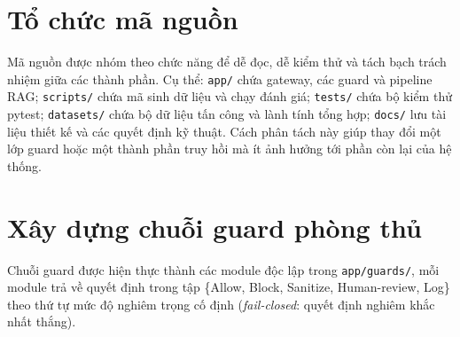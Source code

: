 \section{Tổ chức mã nguồn}

Mã nguồn được nhóm theo chức năng để dễ đọc, dễ kiểm thử và tách bạch trách
nhiệm giữa các thành phần. Cụ thể: \texttt{app/} chứa gateway, các guard và
pipeline RAG; \texttt{scripts/} chứa mã sinh dữ liệu và chạy đánh giá;
\texttt{tests/} chứa bộ kiểm thử pytest; \texttt{datasets/} chứa bộ dữ liệu tấn
công và lành tính tổng hợp; \texttt{docs/} lưu tài liệu thiết kế và các quyết
định kỹ thuật. Cách phân tách này giúp thay đổi một lớp guard hoặc một thành phần
truy hồi mà ít ảnh hưởng tới phần còn lại của hệ thống.

\section{Xây dựng chuỗi guard phòng thủ}

Chuỗi guard được hiện thực thành các module độc lập trong \texttt{app/\allowbreak guards/},
mỗi module trả về quyết định trong tập \{Allow, Block, Sanitize, Human-review,
Log\} theo thứ tự mức độ nghiêm trọng cố định (\emph{fail-closed}: quyết định
nghiêm khắc nhất thắng).

